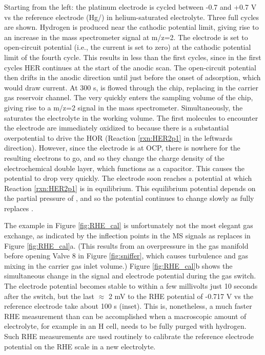 Starting from the left: the platinum electrode is cycled between -0.7 and +0.7 V vs the reference electrode (Hg/) in helium-saturated electrolyte. Three full cycles are shown. Hydrogen is produced near the cathodic potential limit, giving rise to an increase in the mass spectrometer signal at m/z=2. The electrode is set to open-circuit potential (i.e., the current is set to zero) at the cathodic potential limit of the fourth cycle. This results in less  than the first cycles, since in the first cycles HER continues at the start of the anodic scan. The open-circuit potential then drifts in the anodic direction until just before the onset of  adsorption, which would draw current. At 300 s,  is flowed through the chip, replacing  in the carrier gas reservoir channel. The  very quickly enters the sampling volume of the chip, giving rise to a m/z=2 signal in the mass spectrometer. Simultaneously, the  saturates the electrolyte in the working volume. The first  molecules to encounter the electrode are immediately oxidized to  because there is a substantial overpotential to drive the HOR (Reaction \ref{rxn:HER2p1} in the leftwards direction). However, since the electrode is at OCP, there is nowhere for the resulting electrons to go, and so they change the charge density of the electrochemical double layer, which functions as a capacitor\cite{Chan2015a}. This causes the potential to drop very quickly. The electrode soon reaches a potential at which Reaction \ref{rxn:HER2p1} is in equilibrium. This equilibrium potential depends on the partial pressure of , and so the potential continues to change slowly as  fully replaces . 

The example in Figure \ref{fig:RHE_cal} is unfortunately not the most elegant gas exchange, as indicated by the inflection points in the MS signals as  replaces  in Figure \ref{fig:RHE_cal}a. (This results from an overpressure in the gas manifold before opening Valve 8 in Figure \ref{fig:sniffer}, which causes turbulence and gas mixing in the carrier gas inlet volume.) Figure \ref{fig:RHE_cal}b shows the simultaneous change in the  signal and electrode potential during the gas switch. The electrode potential becomes stable to within a few millivolts just 10 seconds after the switch, but the last $\approx$ 2 mV to the RHE potential of -0.717 V vs the reference electrode take about 100 s (inset). This is, nonetheless, a much faster RHE measurement than can be accomplished when a macroscopic amount of electrolyte, for example in an H cell, needs to be fully purged with hydrogen. Such RHE measurements are used routinely to calibrate the reference electrode potential on the RHE scale in a new electrolyte.

